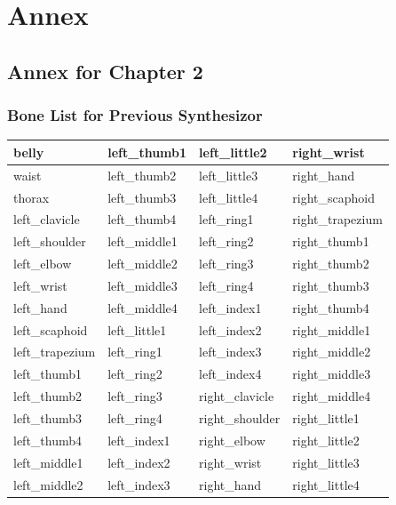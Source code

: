 \documentclass[../main.tex]{subfiles}
\begin{document}
\chapter{Annex}

\section{Annex for Chapter 2}
\label{annex:background_work}

\subsection{Bone List for Previous Synthesizor}
\label{annex:background_work:old_bone_list}

\begin{longtable}{|l|l|l|l|}
    \hline
    belly & left\_thumb1 & left\_little2 & right\_wrist \\ \hline
    waist & left\_thumb2 & left\_little3 & right\_hand \\ \hline
    thorax & left\_thumb3 & left\_little4 & right\_scaphoid \\ \hline
    left\_clavicle & left\_thumb4 & left\_ring1 & right\_trapezium \\ \hline
    left\_shoulder & left\_middle1 & left\_ring2 & right\_thumb1 \\ \hline
    left\_elbow & left\_middle2 & left\_ring3 & right\_thumb2 \\ \hline
    left\_wrist & left\_middle3 & left\_ring4 & right\_thumb3 \\ \hline
    left\_hand & left\_middle4 & left\_index1 & right\_thumb4 \\ \hline
    left\_scaphoid & left\_little1 & left\_index2 & right\_middle1 \\ \hline
    left\_trapezium & left\_ring1 & left\_index3 & right\_middle2 \\ \hline
    left\_thumb1 & left\_ring2 & left\_index4 & right\_middle3 \\ \hline
    left\_thumb2 & left\_ring3 & right\_clavicle & right\_middle4 \\ \hline
    left\_thumb3 & left\_ring4 & right\_shoulder & right\_little1 \\ \hline
    left\_thumb4 & left\_index1 & right\_elbow & right\_little2 \\ \hline
    left\_middle1 & left\_index2 & right\_wrist & right\_little3 \\ \hline
    left\_middle2 & left\_index3 & right\_hand & right\_little4 \\ \hline

\end{longtable}
\end{document}
